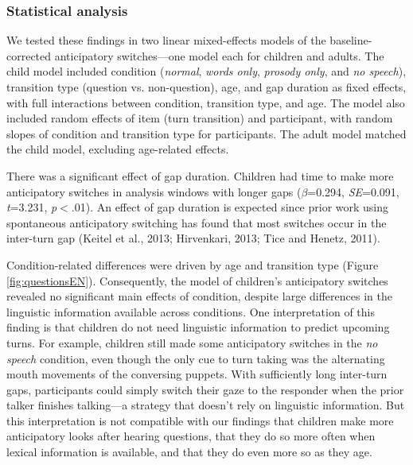 \documentclass[authoryear, 12pt]{elsarticle}
\begin{document}
\subsubsection{Statistical analysis}

We tested these findings in two linear mixed-effects models of the baseline-corrected anticipatory switches---one model each for children and adults. The child model included condition (\textit{normal}, \textit{words only}, \textit{prosody only}, and \textit{no speech}), transition type (question vs. non-question), age, and gap duration as fixed effects, with full interactions between condition, transition type, and age. The model also included random effects of item (turn transition) and participant, with random slopes of condition and transition type for participants. The adult model matched the child model, excluding age-related effects.

There was a significant effect of gap duration. Children had time to make more anticipatory switches in analysis windows with longer gaps (\textit{$\beta$}=0.294, \textit{SE}=0.091, \textit{t}=3.231, \textit{p}$<$.01). An effect of gap duration is expected since prior work using spontaneous anticipatory switching has found that most switches occur in the inter-turn gap (Keitel et al., 2013; Hirvenkari, 2013; Tice and Henetz, 2011).

Condition-related differences were driven by age and transition type (Figure \ref{fig:questionsEN}). Consequently, the model of children's anticipatory switches revealed no significant main effects of condition, despite large differences in the linguistic information available across conditions. One interpretation of this finding is that children do not need linguistic information to predict upcoming turns. For example, children still made some anticipatory switches in the \textit{no speech} condition, even though the only cue to turn taking was the alternating mouth movements of the conversing puppets. With sufficiently long inter-turn gaps, participants could simply switch their gaze to the responder when the prior talker finishes talking---a strategy that doesn't rely on linguistic information. But this interpretation is not compatible with our findings that children make more anticipatory looks after hearing questions, that they do so more often when lexical information is available, and that they do even more so as they age.
\end{document}

